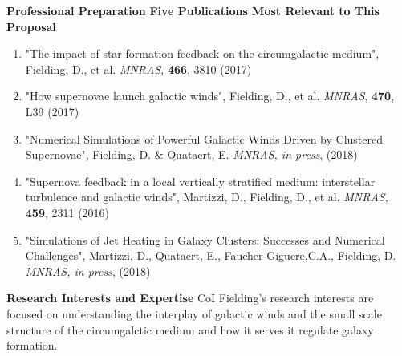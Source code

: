 \documentclass[11pt,letterpaper,english]{article}
\begin{document}
\begin{flushleft} {\bf Professional Preparation}
\vspace{.04in}
{\bf Five Publications Most Relevant to This Proposal}
\vspace{-6pt}
\begin{enumerate} \itemsep1pt \parskip0pt 
\item "The impact of star formation feedback on the circumgalactic medium", Fielding, D., et al. \textit{MNRAS}, {\bf 466}, 3810 (2017)\\ 
\item "How supernovae launch galactic winds", Fielding, D., et al. \textit{MNRAS}, {\bf 470}, L39 (2017)\\ 
\item "Numerical Simulations of Powerful Galactic Winds Driven by Clustered Supernovae", Fielding, D. \& Quataert, E. \textit{MNRAS, in press}, (2018)\\ 
\item "Supernova feedback in a local vertically stratified medium: interstellar turbulence and galactic winds", Martizzi, D.,  Fielding, D., et al. \textit{MNRAS}, {\bf 459}, 2311 (2016)\\ 
\item "Simulations of Jet Heating in Galaxy Clusters: Successes and Numerical Challenges", Martizzi, D., Quataert, E., Faucher-Giguere,C.A., Fielding, D. \textit{MNRAS, in press}, (2018)\\ 
\end{enumerate} 

\vspace{-6pt}
{\bf Research Interests and Expertise}
{\parindent 16pt
CoI Fielding's research interests are focused on understanding the interplay of galactic winds and the small scale structure of the circumgalctic medium and how it serves it regulate galaxy formation. %
}


\end{flushleft}
\end{document}

